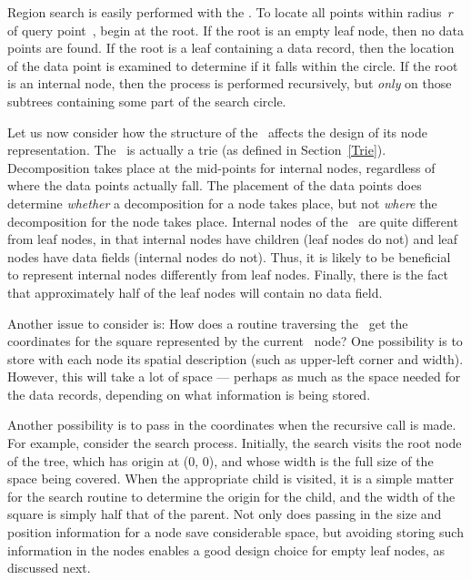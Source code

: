 Region search is easily performed with the \PRquad.
To locate all points within radius~$r$ of query
point~, begin at the root.
If the root is an empty leaf node, then no data points are found.
If the root is a leaf containing a data record, then the location of
the data point is examined to determine if it falls within the 
circle.
If the root is an internal node, then the process is performed
recursively, but \emph{only} on those subtrees containing some part of
the search circle.

Let us now consider how the structure of the \PRquad\ affects the
design of its node representation.
The \PRquad\ is actually a trie (as defined in Section~\ref{Trie}).
Decomposition takes place at the mid-points for internal nodes,
regardless of where the data points actually fall.
The placement of the data points does determine \emph{whether} a
decomposition for a node takes place, but not \emph{where} the
decomposition for the node takes place.
Internal nodes of the \PRquad\ are quite different from leaf nodes, in
that internal nodes have children (leaf nodes do not) and leaf nodes
have data fields (internal nodes do not).
Thus, it is likely to be beneficial to represent internal nodes
differently from leaf nodes.
Finally, there is the fact that approximately half of the leaf nodes
will contain no data field.

Another issue to consider is: How does a routine traversing the
\PRquad\ get the coordinates for the square represented by the current 
\PRquad\ node?
One possibility is to store with each node its spatial description
(such as upper-left corner and width).
However, this will take a lot of space --- perhaps as much as the
space needed for the data records, depending on what information is
being stored.

Another possibility is to pass in the coordinates when the recursive
call is made.
For example, consider the search process.
Initially, the search visits the root node of the tree, which has
origin at (0, 0), and whose width is the full size of the space being 
covered.
When the appropriate child is visited, it is a simple matter for the
search routine to determine the origin for the child, and the width of 
the square is simply half that of the parent.
Not only does passing in the size and position information for a node
save considerable space, but avoiding storing such information
in the nodes enables a good design choice for
empty leaf nodes, as discussed next.

